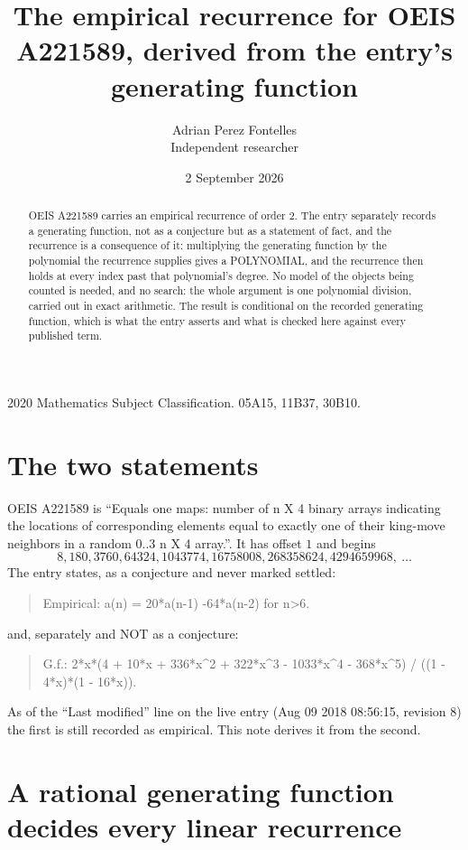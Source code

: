 \documentclass[11pt,a4paper]{article}
\title{The empirical recurrence for OEIS A221589, derived from the entry's generating function}
\author{Adrian Perez Fontelles\\ \small Independent researcher}
\date{2 September 2026}
\theoremstyle{plain}
\theoremstyle{definition}
\begin{document}
\maketitle

\begin{abstract}
OEIS A221589 carries an empirical recurrence of order $2$. The entry separately records a
generating function, not as a conjecture but as a statement of fact, and the recurrence is a
consequence of it: multiplying the generating function by the polynomial the recurrence
supplies gives a POLYNOMIAL, and the recurrence then holds at every index past that
polynomial's degree. No model of the objects being counted is needed, and no search: the
whole argument is one polynomial division, carried out in exact arithmetic. The result is
conditional on the recorded generating function, which is what the entry asserts and what is
checked here against every published term.
\end{abstract}

\noindent\small 2020 Mathematics Subject Classification. 05A15, 11B37, 30B10.\normalsize

\section{The two statements}

OEIS A221589 is ``Equals one maps: number of n X 4 binary arrays indicating the locations of corresponding elements equal to exactly one of their king-move neighbors in a random 0..3 n X 4 array.''. It has offset $1$ and begins
\[
8, 180, 3760, 64324, 1043774, 16758008, 268358624, 4294659968,\ \dots
\]
The entry states, as a conjecture and never marked settled:
\begin{quote}
Empirical: a(n) = 20*a(n-1) -64*a(n-2) for n>6.
\end{quote}
and, separately and NOT as a conjecture:
\begin{quote}
G.f.: 2*x*(4 + 10*x + 336*x\^{}2 + 322*x\^{}3 - 1033*x\^{}4 - 368*x\^{}5) / ((1 - 4*x)*(1 - 16*x)).
\end{quote}
As of the ``Last modified'' line on the live entry (Aug 09 2018 08:56:15, revision 8) the first is still
recorded as empirical. This note derives it from the second.

\section{A rational generating function decides every linear recurrence}
\end{document}
